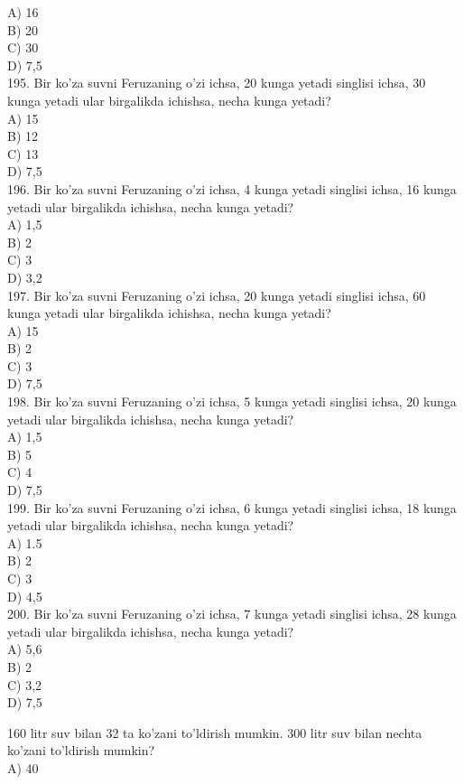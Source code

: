 A) 16\\
B) 20\\
C) 30\\
D) 7,5\\
195. Bir ko'za suvni Feruzaning o'zi ichsa, 20 kunga yetadi singlisi ichsa, 30 kunga yetadi ular birgalikda ichishsa, necha kunga yetadi?\\
A) 15\\
B) 12\\
C) 13\\
D) 7,5\\
196. Bir ko'za suvni Feruzaning o'zi ichsa, 4 kunga yetadi singlisi ichsa, 16 kunga yetadi ular birgalikda ichishsa, necha kunga yetadi?\\
A) 1,5\\
B) 2\\
C) 3\\
D) 3,2\\
197. Bir ko'za suvni Feruzaning o'zi ichsa, 20 kunga yetadi singlisi ichsa, 60 kunga yetadi ular birgalikda ichishsa, necha kunga yetadi?\\
A) 15\\
B) 2\\
C) 3\\
D) 7,5\\
198. Bir ko'za suvni Feruzaning o'zi ichsa, 5 kunga yetadi singlisi ichsa, 20 kunga yetadi ular birgalikda ichishsa, necha kunga yetadi?\\
A) 1,5\\
B) 5\\
C) 4\\
D) 7,5\\
199. Bir ko'za suvni Feruzaning o'zi ichsa, 6 kunga yetadi singlisi ichsa, 18 kunga yetadi ular birgalikda ichishsa, necha kunga yetadi?\\
A) 1.5\\
B) 2\\
C) 3\\
D) 4,5\\
200. Bir ko'za suvni Feruzaning o'zi ichsa, 7 kunga yetadi singlisi ichsa, 28 kunga yetadi ular birgalikda ichishsa, necha kunga yetadi?\\
A) 5,6\\
B) 2\\
C) 3,2\\
D) 7,5
  \item 160 litr suv bilan 32 ta ko'zani to'ldirish mumkin. 300 litr suv bilan nechta ko'zani to'ldirish mumkin?\\
A) 40\\
